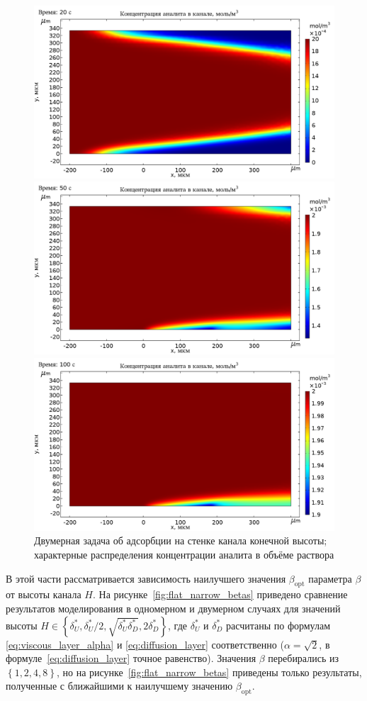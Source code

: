 \documentclass[oneside,final,12pt]{extreport}
\begin{document}
\begin{figure}
  \centering
  \includegraphics[width=.6\textwidth]{pic/flat_narrow_plate_20s}

  \includegraphics[width=.6\textwidth]{pic/flat_narrow_plate_50s}

  \includegraphics[width=.6\textwidth]{pic/flat_narrow_plate_100s}

  \caption{%
    \label{fig:flat_narrow_two_surf_concdistrib}%
    Двумерная задача об адсорбции на стенке канала конечной высоты;
    характерные распределения концентрации аналита в объёме раствора
  }

\end{figure}

В этой части рассматривается зависимость наилучшего значения
$\beta_\text{opt}$ параметра $\beta$ от высоты канала $H$.
На рисунке~\ref{fig:flat_narrow_betas} приведено сравнение
результатов моделирования в одномерном и двумерном случаях
для значений высоты
$H \in \left\{\delta_U^*, \delta_U^*/2, \sqrt{\delta_U^*\delta_D^*}, 2\delta_D^*\right\}$,
где $\delta_U^*$ и $\delta_D^*$
расчитаны по формулам \eqref{eq:viscous_layer_alpha} и \eqref{eq:diffusion_layer}
соответственно ($\alpha = \sqrt{2}$, в формуле~\eqref{eq:diffusion_layer} точное равенство).
Значения $\beta$ перебирались из $\left\{1, 2, 4, 8\right\}$,
но на рисунке~\ref{fig:flat_narrow_betas} приведены только результаты,
полученные с ближайшими к наилучшему значению $\beta_\text{opt}$.
\end{document}
